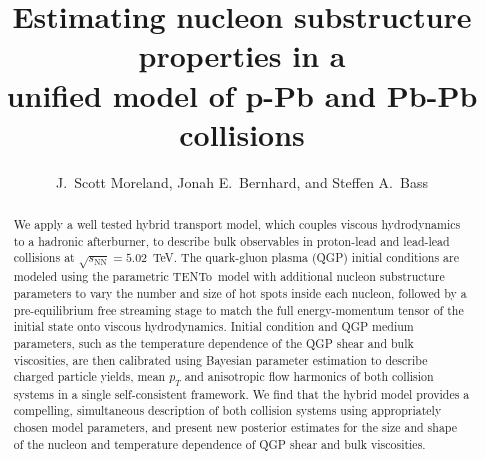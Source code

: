 \documentclass[3p,times,procedia]{elsarticle}
\newcommand{\trento}{T\raisebox{-0.3ex}{R}ENTo}
\newcommand{\sqrts}{\sqrt{s_\mathrm{NN}}}
\begin{document}
\begin{frontmatter}



\dochead{}

\title{Estimating nucleon substructure properties in a\\
unified model of p-Pb and Pb-Pb collisions}

\author{J.\ Scott Moreland, Jonah E.\ Bernhard, and Steffen A.\ Bass}
\address{Department of Physics, Duke University, Durham, NC 27708-0305}

\begin{abstract}
  We apply a well tested hybrid transport model, which couples viscous hydrodynamics to a hadronic afterburner, to describe bulk observables in proton-lead and lead-lead collisions at \mbox{$\sqrts=5.02$~TeV}.
  The quark-gluon plasma (QGP) initial conditions are modeled using the parametric \trento\ model with additional nucleon substructure parameters to vary the number and size of hot spots inside each nucleon, followed by a pre-equilibrium free streaming stage to match the full energy-momentum tensor of the initial state onto viscous hydrodynamics.
  Initial condition and QGP medium parameters, such as the temperature dependence of the QGP shear and bulk viscosities, are then calibrated using Bayesian parameter estimation to describe charged particle yields, mean $p_T$ and anisotropic flow harmonics of both collision systems in a single self-consistent framework.
  We find that the hybrid model provides a compelling, simultaneous description of both collision systems using appropriately chosen model parameters, and present new posterior estimates for the size and shape of the nucleon and temperature dependence of QGP shear and bulk viscosities.
\end{abstract}


\end{frontmatter}
\end{document}
